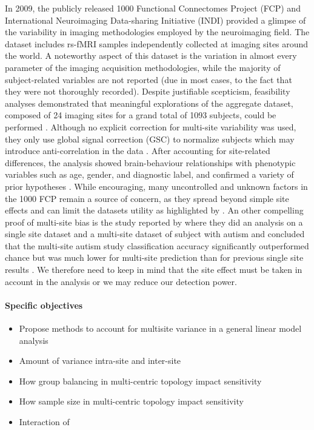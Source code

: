 \documentclass[authoryear]{elsarticle}
\begin{document}
In 2009, the publicly released 1000 Functional Connectomes Project (FCP) and International Neuroimaging Data-sharing Initiative (INDI) provided a glimpse of the variability in imaging methodologies employed by the neuroimaging field. The dataset includes rs-fMRI samples independently collected at imaging sites around the world. A noteworthy aspect of this dataset is the variation in almost every parameter of the imaging acquisition methodologies, while the majority of subject-related variables are not reported (due in most cases, to the fact that they were not thoroughly recorded). 
Despite justifiable scepticism, feasibility analyses demonstrated that meaningful explorations of the aggregate dataset, composed of 24 imaging sites for a grand total of 1093 subjects, could be performed \citep{Biswal2010}. Although no explicit correction for multi-site variability was used, they only use global signal correction (GSC) to normalize subjects which may introduce anti-correlation in the data \citep{Fox2009, Murphy2009, Saad2012, Carbonell2014, Power2014}. After accounting for site-related differences, the analysis showed brain-behaviour relationships with phenotypic variables such as age, gender, and diagnostic label, and confirmed a variety of prior hypotheses \citep{Biswal2010, Fair2012, Tomasi2010, Zuo2012}. While encouraging, many uncontrolled and unknown factors in the 1000 FCP remain a source of concern, as they spread beyond simple site effects and can limit the datasets utility as highlighted by \cite{Yan2013}.
An other compelling proof of multi-site bias is the study reported by \cite{Nielsen2013} where they did an analysis on a single site dataset and a multi-site dataset of subject with autism and concluded that the multi-site autism study classification accuracy significantly outperformed chance but was much lower for multi-site prediction than for previous single site results \citep{Nielsen2013}. We therefore need to keep in mind that the site effect must be taken in account in the analysis or we may reduce our detection power.

\paragraph{Specific objectives} 

\begin{itemize}
 \item Propose methods to account for multisite variance in a general linear model analysis
 \item Amount of variance intra-site and inter-site
 \item How group balancing in multi-centric topology impact sensitivity
 \item How sample size in multi-centric topology impact sensitivity
 \item Interaction of 
\end{itemize}
\end{document}
